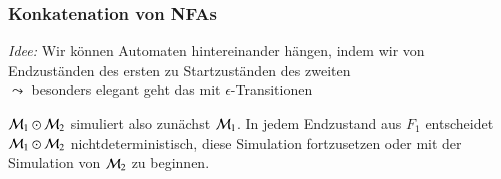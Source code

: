\documentclass[onlymath]{beamer}
\begin{document}
\begin{frame}\frametitle{Konkatenation von NFAs}

\emph{Idee:} Wir können Automaten hintereinander hängen, indem wir von Endzuständen des ersten
zu Startzuständen des zweiten \\
$\leadsto$ besonders elegant geht das mit $\epsilon$-Transitionen
\bigskip


$\mathcal{M}_1\odot\mathcal{M}_2$ simuliert also zunächst $\mathcal{M}_1$. In jedem Endzustand aus $F_1$ entscheidet
$\mathcal{M}_1\odot\mathcal{M}_2$ nichtdeterministisch, diese Simulation fortzusetzen oder mit der Simulation von $\mathcal{M}_2$ zu beginnen.

\end{frame}
\end{document}

